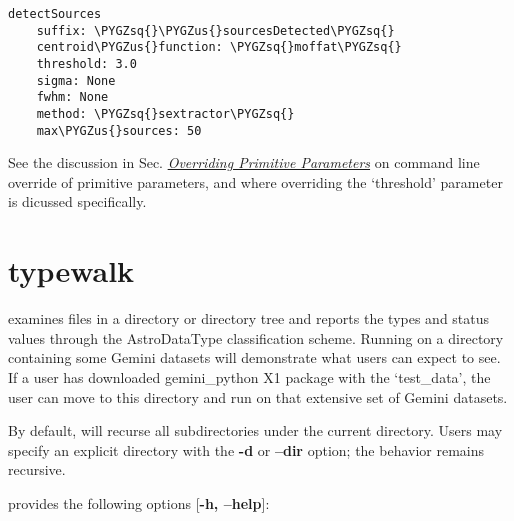 \documentclass[letterpaper,10pt,english]{sphinxmanual}
\def\PYGZus{\char`\_}
\def\PYGZsq{\char`\'}
\begin{document}
\begin{Verbatim}[commandchars=\\\{\}]
detectSources
    suffix: \PYGZsq{}\PYGZus{}sourcesDetected\PYGZsq{}
    centroid\PYGZus{}function: \PYGZsq{}moffat\PYGZsq{}
    threshold: 3.0
    sigma: None
    fwhm: None
    method: \PYGZsq{}sextractor\PYGZsq{}
    max\PYGZus{}sources: 50
\end{Verbatim}

See the discussion in Sec. {\hyperref[interfaces:userpars]{\emph{Overriding Primitive Parameters}}} on command line override of
primitive parameters, and where overriding the `threshold' parameter is dicussed
specifically.


\section{typewalk}
\label{supptools:typewalk}\label{supptools:id1}
 examines files in a directory or directory tree and reports the types
and status values through the AstroDataType classification scheme. Running 
on a directory containing some Gemini datasets will demonstrate what users can expect
to see. If a user has downloaded gemini\_python X1 package with the `test\_data', the
user can move to this directory and run  on that extensive set of
Gemini datasets.

By default,  will recurse all subdirectories under the current
directory. Users may specify an explicit directory with the \textbf{-d} or
\textbf{--dir} option; the behavior remains recursive.

 provides the following options {[}\textbf{-h, --help}{]}:
\end{document}
